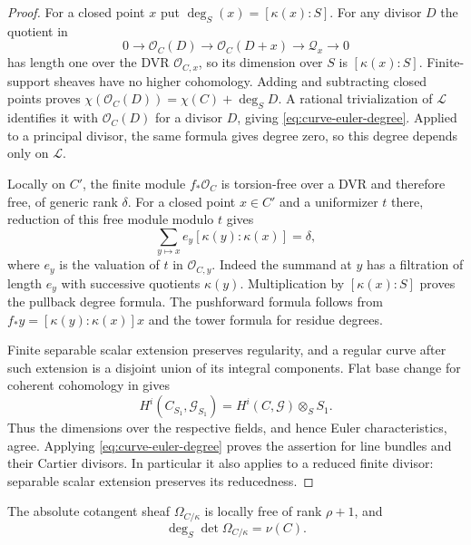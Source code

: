 \begin{proof}
For a closed point $x$ put $\deg_S(x)=[\kappa(x):S]$.  For any divisor $D$
the quotient in
\[
 0\longrightarrow\mathcal O_C(D)
 \longrightarrow\mathcal O_C(D+x)
 \longrightarrow\mathcal Q_x\longrightarrow0
\]
has length one over the DVR $\mathcal O_{C,x}$, so its dimension over $S$
is $[\kappa(x):S]$.  Finite-support sheaves have no higher cohomology.
Adding and subtracting closed points proves
$\chi(\mathcal O_C(D))=\chi(C)+\deg_S D$.  A rational trivialization of
$\mathcal L$ identifies it with $\mathcal O_C(D)$ for a divisor $D$, giving
\eqref{eq:curve-euler-degree}.  Applied to a principal divisor, the same
formula gives degree zero, so this degree depends only on $\mathcal L$.

Locally on $C'$, the finite module $f_*\mathcal O_C$ is torsion-free over
a DVR and therefore free, of generic rank $\delta$.
For a closed point $x\in C'$ and a uniformizer $t$ there, reduction of
this free module modulo $t$ gives
\begin{equation}
 \sum_{y\mapsto x}e_y[\kappa(y):\kappa(x)]=\delta,
 \label{eq:local-degree-formula}
\end{equation}
where $e_y$ is the valuation of $t$ in $\mathcal O_{C,y}$.
Indeed the summand at $y$ has a filtration of length $e_y$ with
successive quotients $\kappa(y)$.  Multiplication by
$[\kappa(x):S]$ proves the pullback degree formula.  The pushforward
formula follows from
$f_*y=[\kappa(y):\kappa(x)]x$ and the tower formula for residue degrees.

Finite separable scalar extension preserves regularity, and a regular
curve after such extension is a disjoint union of its integral
components.  Flat base change for coherent cohomology
in  gives
\[
 H^i(C_{S_1},\mathcal G_{S_1})
   =H^i(C,\mathcal G)\otimes_S S_1.
\]
Thus the dimensions over the respective fields, and hence Euler
characteristics, agree.  Applying
\eqref{eq:curve-euler-degree} proves the assertion for line bundles and
their Cartier divisors.  In particular it also applies to a reduced
finite divisor: separable scalar extension preserves its reducedness.
\end{proof}

\begin{proposition}
\label{prop:absolute-genus}
The absolute cotangent sheaf $\Omega_{C/\kappa}$ is locally free of rank
$\rho+1$, and
\begin{equation}
 \deg_S\det\Omega_{C/\kappa}=\nu(C).
 \label{eq:absolute-determinant-genus}
\end{equation}
\end{proposition}

